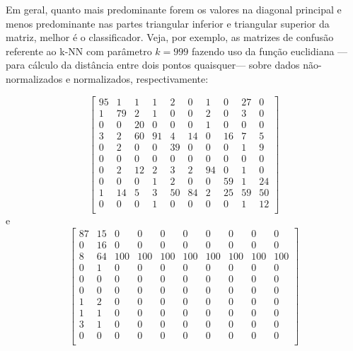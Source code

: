 \documentclass[10pt,a4paper,twocolumn]{article}
\begin{document}
      Em geral, quanto mais predominante forem os valores na diagonal principal
      e menos predominante nas partes triangular inferior e triangular superior
      da matriz, melhor é o classificador. Veja, por exemplo, as matrizes de 
      confusão referente ao k-NN com parâmetro $k=999$ fazendo uso da função
      euclidiana ---para cálculo da distância entre dois pontos quaisquer---
      sobre dados não-normalizados e normalizados, respectivamente:

      \begin{equation*}
        \left [
        \begin{smallmatrix}
          95 &  1 &  1 &  1 &  2 &  0 &  1 &  0 & 27 &  0 \\
           1 & 79 &  2 &  1 &  0 &  0 &  2 &  0 &  3 &  0 \\ 
           0 &  0 & 20 &  0 &  0 &  0 &  1 &  0 &  0 &  0 \\ 
           3 &  2 & 60 & 91 &  4 & 14 &  0 & 16 &  7 &  5 \\ 
           0 &  2 &  0 &  0 & 39 &  0 &  0 &  0 &  1 &  9 \\ 
           0 &  0 &  0 &  0 &  0 &  0 &  0 &  0 &  0 &  0 \\ 
           0 &  2 & 12 &  2 &  3 &  2 & 94 &  0 &  1 &  0 \\ 
           0 &  0 &  0 &  1 &  2 &  0 &  0 & 59 &  1 & 24 \\ 
           1 & 14 &  5 &  3 & 50 & 84 &  2 & 25 & 59 & 50 \\ 
           0 &  0 &  0 &  1 &  0 &  0 &  0 &  0 &  1 & 12 \\ 
        \end{smallmatrix} \right ]
      \end{equation*}
      e
      \begin{equation*}
        \left [
        \begin{smallmatrix}
          87 & 15 &  0 &  0 &  0 &  0 &  0 &  0 &  0 &  0 \\
           0 & 16 &  0 &  0 &  0 &  0 &  0 &  0 &  0 &  0 \\ 
           8 & 64 &100 &100 &100 &100 &100 &100 &100 &100 \\ 
           0 &  1 &  0 &  0 &  0 &  0 &  0 &  0 &  0 &  0 \\ 
           0 &  0 &  0 &  0 &  0 &  0 &  0 &  0 &  0 &  0 \\ 
           0 &  0 &  0 &  0 &  0 &  0 &  0 &  0 &  0 &  0 \\ 
           1 &  2 &  0 &  0 &  0 &  0 &  0 &  0 &  0 &  0 \\ 
           1 &  1 &  0 &  0 &  0 &  0 &  0 &  0 &  0 &  0 \\ 
           3 &  1 &  0 &  0 &  0 &  0 &  0 &  0 &  0 &  0 \\ 
           0 &  0 &  0 &  0 &  0 &  0 &  0 &  0 &  0 &  0 \\ 
        \end{smallmatrix} \right ]
      \end{equation*}
\end{document}
